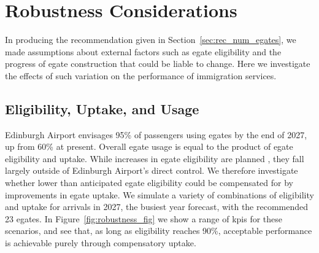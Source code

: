 \documentclass[10pt]{article}
\begin{document}


\vspace{2mm}
\begin{center}
\label{tab:split}
\end{center}


\section{Robustness Considerations} \label{sec:robustness}
In producing the recommendation given in Section~\ref{sec:rec_num_egates}, we made assumptions about external factors such as \gls{egate} eligibility and the progress of \gls{egate} construction that could be liable to change. Here we investigate the effects of such variation on the performance of immigration services.

\subsection{Eligibility, Uptake, and Usage}
Edinburgh Airport envisages 95\% of passengers using \glspl{egate} by the end of 2027, up from 60\% at present. Overall \gls{egate} usage is equal to the product of \gls{egate} eligibility and uptake. While increases in \gls{egate} eligibility are planned \cite{UK_border_2025}, they fall largely outside of Edinburgh Airport's direct control. We therefore investigate whether lower than anticipated \gls{egate} eligibility could be compensated for by improvements in \gls{egate} uptake. We simulate a variety of combinations of eligibility and uptake for arrivals in 2027, the busiest year forecast, with the recommended 23 \glspl{egate}. In Figure~\ref{fig:robustness_fig} we show a range of \glspl{kpi} for these scenarios, and see that, as long as eligibility reaches 90\%, acceptable performance is achievable purely through compensatory uptake.
\end{document}
